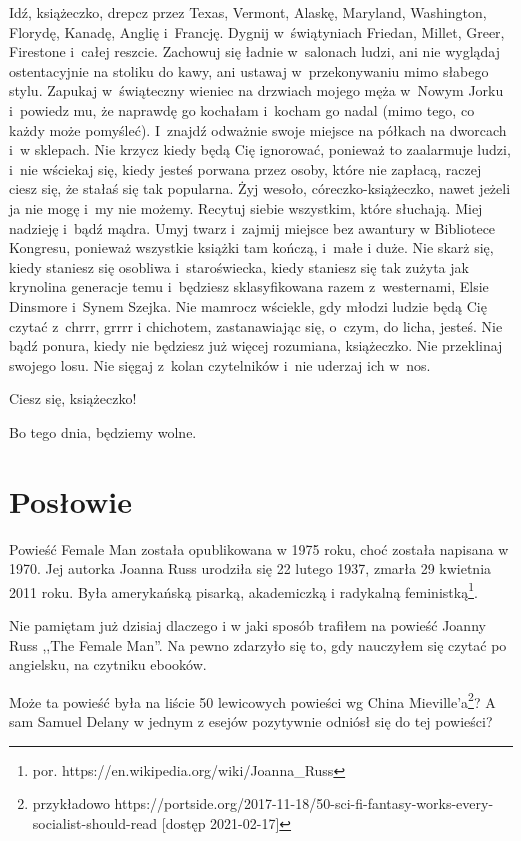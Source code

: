 \documentclass[oneside,polish,12pt,sfheadings]{mwbk}
\begin{document}
Idź, książeczko, drepcz przez Texas, Vermont, Alaskę, Maryland, Washington,
Florydę, Kanadę, Anglię i~Francję. Dygnij w~świątyniach Friedan, Millet,
Greer, Firestone i~całej reszcie. Zachowuj się ładnie w~salonach ludzi,
ani nie wyglądaj ostentacyjnie na stoliku do kawy, ani ustawaj w~przekonywaniu
mimo słabego stylu. Zapukaj w~świąteczny wieniec na drzwiach mojego
męża w~Nowym Jorku i~powiedz mu, że naprawdę go kochałam i~kocham
go nadal (mimo tego, co każdy może pomyśleć). I~znajdź odważnie swoje
miejsce na półkach na dworcach i~w sklepach. Nie krzycz kiedy będą
Cię ignorować, ponieważ to zaalarmuje ludzi, i~nie wściekaj się, kiedy
jesteś porwana przez osoby, które nie zapłacą, raczej ciesz się, że
stałaś się tak popularna. Żyj wesoło, córeczko-książeczko, nawet jeżeli
ja nie mogę i~my nie możemy. Recytuj siebie wszystkim, które słuchają.
Miej nadzieję i~bądź mądra. Umyj twarz i~zajmij miejsce bez awantury
w Bibliotece Kongresu, ponieważ wszystkie książki tam kończą, i~małe
i duże. Nie skarż się, kiedy staniesz się osobliwa i~staroświecka,
kiedy staniesz się tak zużyta jak krynolina generacje temu i~będziesz
sklasyfikowana razem z~westernami, Elsie Dinsmore i~Synem Szejka.
Nie mamrocz wściekle, gdy młodzi ludzie będą Cię czytać z~chrrr, grrrr
i chichotem, zastanawiając się, o~czym, do licha, jesteś. Nie bądź ponura,
kiedy nie będziesz już więcej rozumiana, książeczko. Nie przeklinaj
swojego losu. Nie sięgaj z~kolan czytelników i~nie uderzaj ich w~nos.

Ciesz się, książeczko!

Bo tego dnia, będziemy wolne.

\chapter*{Posłowie}

Powieść Female Man została opublikowana w 1975 roku, choć została napisana w 1970. Jej autorka Joanna Russ urodziła się 22 lutego 1937, zmarła 29 kwietnia 2011 roku. Była amerykańską pisarką, akademiczką i radykalną feministką\footnote{por. https://en.wikipedia.org/wiki/Joanna\_Russ}. 

Nie pamiętam już dzisiaj dlaczego i w jaki sposób trafiłem na powieść Joanny Russ ,,The Female Man''. Na pewno zdarzyło się to, gdy nauczyłem się czytać po angielsku, na czytniku ebooków. 

Może ta powieść była na liście 50 lewicowych powieści wg China Mieville’a\footnote{przykładowo https://portside.org/2017-11-18/50-sci-fi-fantasy-works-every-socialist-should-read [dostęp 2021-02-17]}? A sam Samuel Delany w jednym z esejów pozytywnie odniósł się do tej powieści?
\end{document}
